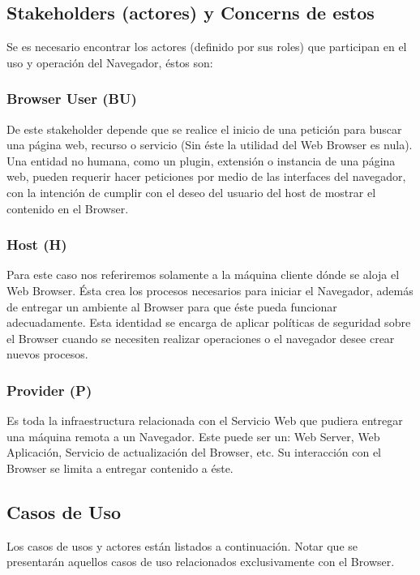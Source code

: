 	\subsection{Stakeholders (actores) y Concerns de estos}
	Se es necesario encontrar los actores (definido por sus roles) que participan en el uso y operación del Navegador, éstos son:
		\subsubsection{Browser User (BU)}
		De este stakeholder depende que se realice el inicio de una petición para buscar una página web, recurso o servicio (Sin éste la utilidad del Web Browser es nula). Una entidad no humana, como un plugin, extensión o instancia de una página web, pueden requerir hacer peticiones por medio de las interfaces del navegador, con la intención de cumplir con el deseo del usuario del host de mostrar el contenido en el Browser.
		\subsubsection{Host (H)}
		Para este caso nos referiremos solamente a la máquina cliente dónde se aloja el Web Browser. Ésta crea los procesos necesarios para iniciar el Navegador, además de entregar un ambiente al Browser para que éste pueda funcionar adecuadamente.  Esta identidad se encarga de aplicar políticas de seguridad sobre el Browser cuando se necesiten realizar operaciones o el navegador desee crear nuevos procesos.
		\subsubsection{Provider (P)}
		Es toda la infraestructura relacionada con el Servicio Web que pudiera entregar una máquina remota a un Navegador. Este puede ser un: Web Server, Web Aplicación, Servicio de actualización del Browser, etc. Su interacción con el Browser se limita a entregar contenido a éste.
		\subsection{Casos de Uso}
Los casos de usos y actores están listados a continuación. Notar que se presentarán aquellos casos de uso relacionados exclusivamente con el Browser.

